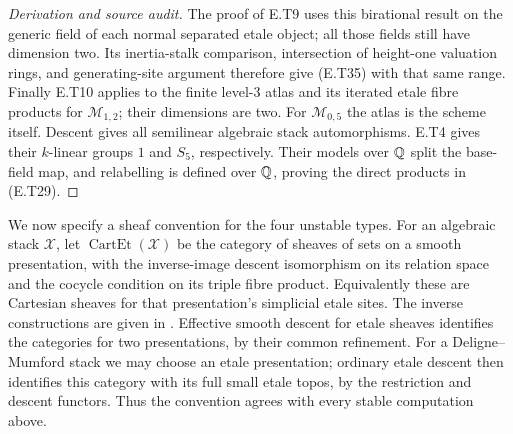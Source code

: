 \begin{proof}[Derivation and source audit]
The proof of E.T9 uses this birational result on the generic
field of each normal separated etale object; all those fields
still have dimension two.  Its inertia-stalk comparison,
intersection of height-one valuation rings, and generating-site
argument therefore give (E.T35) with that same range.  Finally
E.T10 applies to the finite level-$3$ atlas and its iterated
etale fibre products for $\mathcal M_{1,2}$; their dimensions
are two.  For $\mathcal M_{0,5}$ the atlas is the scheme itself.
Descent gives all semilinear algebraic stack automorphisms.
E.T4 gives their $k$-linear groups $1$ and $S_5$, respectively.
Their models over $\mathbb Q$ split the base-field map, and relabelling
is defined over $\mathbb Q$, proving the direct products in (E.T29).
\end{proof}

We now specify a sheaf convention for the four unstable types.
For an algebraic stack $\mathcal X$, let
$\operatorname{CartEt}(\mathcal X)$ be the category of sheaves
of sets on a smooth presentation, with the inverse-image
descent isomorphism on its relation space and the cocycle
condition on its triple fibre product.  Equivalently these are
Cartesian sheaves for that presentation's simplicial etale
sites.  The inverse constructions are given in
\cite[Lemma 85.12.4]{StacksCartesianDescent}.
Effective smooth descent for etale sheaves identifies the
categories for two presentations, by their common refinement.
For a Deligne--Mumford stack we may choose an etale presentation;
ordinary etale descent then identifies this category with its
full small etale topos, by the restriction and descent functors.
Thus the convention agrees with every stable computation above.

